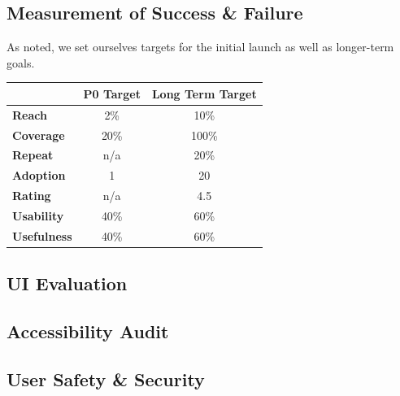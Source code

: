 \subsection{Measurement of Success \& Failure}
As noted, we set ourselves targets for the initial launch as well as longer-term goals.

\begin{table}[H]
\centering
\begin{tabular}{@{}lcc@{}}
\toprule
                  & \multicolumn{1}{l}{\textbf{P0 Target}} & \multicolumn{1}{l}{\textbf{Long Term Target}} \\ \midrule
\textbf{Reach}    & 2\%                                   & 10\%                                         \\
\textbf{Coverage} & 20\%                                  & 100\%                                        \\
\textbf{Repeat}   & n/a                                   & 20\%                                         \\
\textbf{Adoption} & 1                                     & 20                                           \\
\textbf{Rating}   & n/a                                   & 4.5                                          \\ 
\textbf{Usability}   & 40\%                                   & 60\%                                          \\ 
\textbf{Usefulness}   & 40\%                                 & 60\%                                          \\ \bottomrule

\end{tabular}
\end{table}

\subsection{UI Evaluation}\label{sec:uieval}


\subsection{Accessibility Audit}\label{sec:access}


\subsection{User Safety \& Security}\label{sec:usersafety}


